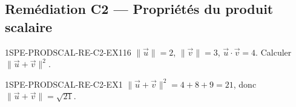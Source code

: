 
\subsection*{Remédiation C2 — Propriétés du produit scalaire}

\begin{exercice}{1SPE-PRODSCAL-RE-C2-EX1}{1}{6}
$\|\vec{u}\| = 2$, $\|\vec{v}\| = 3$, $\vec{u} \cdot \vec{v} = 4$. Calculer $\|\vec{u} + \vec{v}\|^2$.
\end{exercice}


\begin{corrige}{1SPE-PRODSCAL-RE-C2-EX1}
$\|\vec{u}+\vec{v}\|^2 = 4 + 8 + 9 = 21$, donc $\|\vec{u}+\vec{v}\| = \sqrt{21}$.
\end{corrige}

